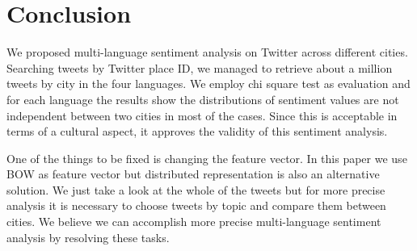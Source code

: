 \documentclass[twocolumn]{article}
\begin{document}
\vspace{-6mm}

\section{Conclusion}
\vspace{-2mm}
We proposed multi-language sentiment analysis on Twitter across different cities.
Searching tweets by Twitter place ID, we managed to retrieve about a million tweets by city in the four languages.
We employ chi square test as evaluation and for each language the results show the distributions of sentiment values are not independent between two cities in most of the cases.
Since this is acceptable in terms of a cultural aspect, it approves the validity of this sentiment analysis.

One of the things to be fixed is changing the feature vector.
In this paper we use BOW as feature vector but distributed representation is also an alternative solution.
We just take a look at the whole of the tweets but for more precise analysis it is necessary to choose tweets by topic and compare them between cities.
We believe we can accomplish more precise multi-language sentiment analysis by resolving these tasks.

\vspace{-6mm}


\end{document}
